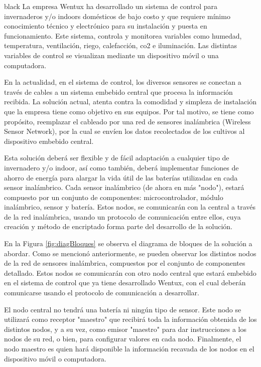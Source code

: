 \documentclass[11pt]{charter}
\begin{document}
\begin{consigna}{black}
La empresa Wentux ha desarrollado un sistema de control para invernaderos y/o indoors domésticos de bajo costo y que requiere mínimo conocimiento técnico y electrónico para su instalación y puesta en funcionamiento. Este sistema, controla y monitorea variables como humedad, temperatura, ventilación, riego, calefacción, co2 e iluminación.
Las distintas variables de control se visualizan mediante un dispositivo móvil o una computadora.

En la actualidad, en el sistema de control, los diversos sensores se conectan a través de cables a un sistema embebido central que procesa la información recibida. La solución actual, atenta contra la comodidad y simpleza de instalación que la empresa tiene como objetivo en sus equipos. Por tal motivo, se tiene como propósito, reemplazar el cableado por una red de sensores inalámbrica (Wireless Sensor Network), por la cual se envíen los datos recolectados de los cultivos al dispositivo embebido central.

Esta solución deberá ser flexible y de fácil adaptación a cualquier tipo de invernadero y/o indoor, así como también, deberá implementar funciones de ahorro de energía para alargar la vida útil de las baterías utilizadas en cada sensor inalámbrico.
Cada sensor inalámbrico (de ahora en más "nodo"), estará compuesto por un conjunto de componentes: microcontrolador, módulo inalámbrico, sensor y batería. Estos nodos, se comunicarán con la central a través de la red inalámbrica, usando un protocolo de comunicación entre ellos, cuya creación y método de encriptado forma parte del desarrollo de la solución.

En la Figura \ref{fig:diagBloques} se observa el diagrama de bloques de la solución a abordar. Como se mencionó anteriormente, se pueden observar los distintos nodos de la red de sensores inalámbrica, compuestos por el conjunto de componentes detallado. Estos nodos se comunicarán con otro nodo central que estará embebido en el sistema de control que ya tiene desarrollado Wentux, con el cual deberán comunicarse usando el protocolo de comunicación a desarrollar.

El nodo central no tendrá una batería ni ningún tipo de sensor. Este nodo se utilizará como receptor "maestro" {} que recibirá toda la información obtenida de los distintos nodos, y a su vez, como emisor  "maestro" {} para dar instrucciones a los nodos de su red, o bien, para configurar valores en cada nodo.
Finalmente, el nodo maestro es quien hará disponible la información recavada de los nodos en el dispositivo móvil o computadora.


\end{consigna}
\end{document}
